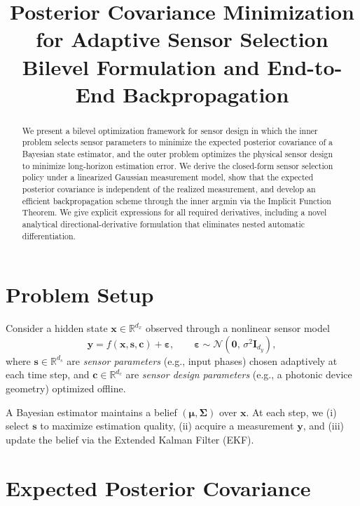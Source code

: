 \documentclass[11pt]{article}
\title{Posterior Covariance Minimization for Adaptive Sensor Selection\\[4pt]
       \large Bilevel Formulation and End-to-End Backpropagation}
\author{}
\date{}
\newcommand{\R}{\mathbb{R}}
\newcommand{\bx}{\bm{x}}
\newcommand{\by}{\bm{y}}
\newcommand{\bs}{\bm{s}}
\newcommand{\bc}{\bm{c}}
\newcommand{\bmu}{\bm{\mu}}
\newcommand{\bep}{\bm{\varepsilon}}
\theoremstyle{definition}
\begin{document}
\maketitle

\begin{abstract}
We present a bilevel optimization framework for sensor design in which the
inner problem selects sensor parameters to minimize the expected posterior
covariance of a Bayesian state estimator, and the outer problem optimizes
the physical sensor design to minimize long-horizon estimation error.  We
derive the closed-form sensor selection policy under a linearized Gaussian
measurement model, show that the expected posterior covariance is
independent of the realized measurement, and develop an efficient
backpropagation scheme through the inner argmin via the Implicit Function
Theorem.  We give explicit expressions for all required derivatives,
including a novel analytical directional-derivative formulation that
eliminates nested automatic differentiation.
\end{abstract}

\section{Problem Setup}
\label{sec:setup}

Consider a hidden state $\bx \in \R^{d_x}$ observed through a nonlinear
sensor model
\begin{equation}
  \by = f(\bx, \bs, \bc) + \bep, \qquad
  \bep \sim \mathcal{N}(\bm{0},\, \sigma^2 \bm{I}_{d_y}),
  \label{eq:obs-model}
\end{equation}
where $\bs \in \R^{d_s}$ are \emph{sensor parameters} (e.g., input
phases) chosen adaptively at each time step, and $\bc \in \R^{d_c}$ are
\emph{sensor design parameters} (e.g., a photonic device geometry)
optimized offline.

A Bayesian estimator maintains a belief $(\bmu, \bm{\Sigma})$ over $\bx$.
At each step, we (i) select $\bs$ to maximize estimation quality, (ii)
acquire a measurement $\by$, and (iii) update the belief via the Extended
Kalman Filter (EKF).

\section{Expected Posterior Covariance}
\label{sec:posterior-cov}
\end{document}
